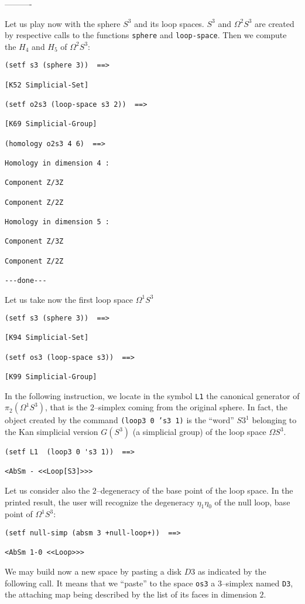 \begin{center}
----------
\end{center}
Let us play now with the sphere $S^3$ and its loop spaces. $S^3$ and $\Omega^2 S^3$ are created by
respective calls to the functions {\tt sphere} and {\tt loop-space}. Then we compute the $H_4$ and $H_5$
of $\Omega^2 S^3$:
{\footnotesize\begin{verbatim}
(setf s3 (sphere 3))  ==>

[K52 Simplicial-Set]

(setf o2s3 (loop-space s3 2))  ==>

[K69 Simplicial-Group]

(homology o2s3 4 6)  ==>

Homology in dimension 4 :

Component Z/3Z

Component Z/2Z

Homology in dimension 5 :

Component Z/3Z

Component Z/2Z

---done---
\end{verbatim}}
\newpage
Let us take now the first loop space $\Omega^1 S^3$ 
{\footnotesize\begin{verbatim}
(setf s3 (sphere 3))  ==>

[K94 Simplicial-Set]

(setf os3 (loop-space s3))  ==>

[K99 Simplicial-Group]
\end{verbatim}}
In the following instruction, we locate in the symbol {\tt L1} the canonical generator of 
$\pi_2 (\Omega^1S^3)$, that is the $2$--simplex coming from the original sphere. In fact, the object
created by the command {\tt (loop3 0 's3 1)} is the ``word'' $S3^1$ belonging to the 
Kan simplicial version $G(S^3)$ (a simplicial group) of the loop space $\Omega S^3$. 
{\footnotesize\begin{verbatim}
(setf L1  (loop3 0 's3 1))  ==>

<AbSm - <<Loop[S3]>>>
\end{verbatim}}
Let us consider also the $2$--degeneracy of the base point of the loop space. In the printed
result, the user will recognize the degeneracy $\eta_1\eta_0$ of the null loop, base point of
$\Omega^1 S^3$:
{\footnotesize\begin{verbatim}
(setf null-simp (absm 3 +null-loop+))  ==>

<AbSm 1-0 <<Loop>>>
\end{verbatim}}
We may  build now a new space by pasting a disk $D3$ as indicated by the 
following call. It means that we ``paste'' to the space {\tt os3} a $3$--simplex named {\tt D3},
the attaching map being described by the list of its faces in dimension $2$.

